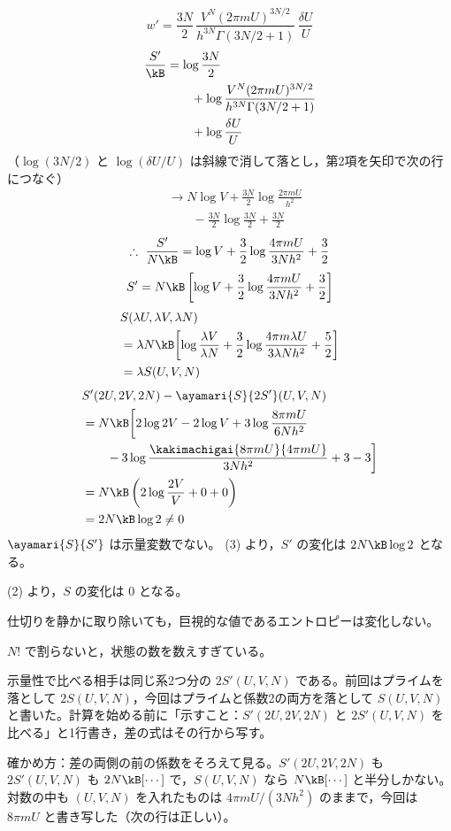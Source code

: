 \[ w'=\frac{3N}{2}\,\frac{V^{N}(2\pi mU)^{3N/2}}{h^{3N}\Gamma(3N/2+1)}\,\frac{\delta U}{U} \]
\begin{align*}
\frac{S'}{\kB}&=\log\frac{3N}{2}\\
&\qquad+\log\frac{V^{N}(2\pi mU)^{3N/2}}{h^{3N}\Gamma(3N/2+1)}\\
&\qquad+\log\frac{\delta U}{U}
\end{align*}
（$\log(3N/2)$ と $\log(\delta U/U)$ は斜線で消して落とし，第2項を矢印で次の行につなぐ）
\begin{align*}
&\to N\log V+\frac{3N}{2}\log\frac{2\pi mU}{h^{2}}\\
&\qquad-\frac{3N}{2}\log\frac{3N}{2}+\frac{3N}{2}
\end{align*}
\[ \therefore\ \frac{S'}{N\kB}=\log V+\frac{3}{2}\log\frac{4\pi mU}{3Nh^{2}}+\frac{3}{2} \]
\[ S'=N\kB\left[\log V+\frac{3}{2}\log\frac{4\pi mU}{3Nh^{2}}+\frac{3}{2}\right] \]
\begin{align*}
&S(\lambda U,\lambda V,\lambda N)\\
&=\lambda N\kB\biggl[\log\frac{\lambda V}{\lambda N}+\frac{3}{2}\log\frac{4\pi m\lambda U}{3\lambda Nh^{2}}+\frac{5}{2}\biggr]\\
&=\lambda S(U,V,N)
\end{align*}
\begin{align*}
&S'(2U,2V,2N)-\ayamari{S}{2S'}(U,V,N)\\
&=N\kB\biggl[2\log2V-2\log V+3\log\frac{8\pi mU}{6Nh^{2}}\\
&\qquad-3\log\frac{\kakimachigai{8\pi mU}{4\pi mU}}{3Nh^{2}}+3-3\biggr]\\
&=N\kB\left(2\log\frac{2V}{V}+0+0\right)\\
&=2N\kB\log2\neq0
\end{align*}
$\ayamari{S}{S'}$ は示量変数でない。
(3) より，$S'$ の変化は $2N\kB\log2$ となる。

(2) より，$S$ の変化は $0$ となる。

仕切りを静かに取り除いても，巨視的な値であるエントロピーは変化しない。

$N!$ で割らないと，状態の数を数えすぎている。
\item {} 示量性で比べる相手は同じ系2つ分の $2S'(U,V,N)$ である。前回はプライムを落として $2S(U,V,N)$，今回はプライムと係数2の両方を落として $S(U,V,N)$ と書いた。計算を始める前に「示すこと：$S'(2U,2V,2N)$ と $2S'(U,V,N)$ を比べる」と1行書き，差の式はその行から写す。
\item 確かめ方：差の両側の前の係数をそろえて見る。$S'(2U,2V,2N)$ も $2S'(U,V,N)$ も $2N\kB[\cdots]$ で，$S(U,V,N)$ なら $N\kB[\cdots]$ と半分しかない。対数の中も $(U,V,N)$ を入れたものは $4\pi mU/(3Nh^{2})$ のままで，今回は $8\pi mU$ と書き写した（次の行は正しい）。

